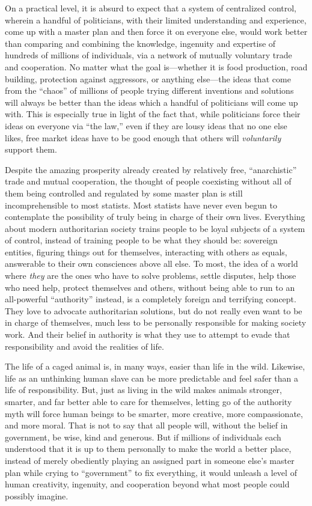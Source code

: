 \documentclass{book}
\begin{document}
On a practical level, it is absurd to expect that a system of centralized control, wherein a handful of politicians, with their limited understanding and experience, come up with a master plan and then force it on everyone else, would work better than comparing and combining the knowledge, ingenuity and expertise of hundreds of millions of individuals, via a network of mutually voluntary trade and cooperation. No matter what the goal is---whether it is food production, road building, protection against aggressors, or anything else---the ideas that come from the \enquote{chaos} of millions of people trying different inventions and solutions will always be better than the ideas which a handful of politicians will come up with. This is especially true in light of the fact that, while politicians force their ideas on everyone via \enquote{the law,} even if they are lousy ideas that no one else likes, free market ideas have to be good enough that others will \emph{voluntarily} support them.

Despite the amazing prosperity already created by relatively free, \enquote{anarchistic} trade and mutual cooperation, the thought of people coexisting without all of them being controlled and regulated by some master plan is still incomprehensible to most statists. Most statists have never even begun to contemplate the possibility of truly being in charge of their own lives. Everything about modern authoritarian society trains people to be loyal subjects of a system of control, instead of training people to be what they should be: sovereign entities, figuring things out for themselves, interacting with others as equals, answerable to their own consciences above all else. To most, the idea of a world where \emph{they} are the ones who have to solve problems, settle disputes, help those who need help, protect themselves and others, without being able to run to an all-powerful \enquote{authority} instead, is a completely foreign and terrifying concept. They love to advocate authoritarian solutions, but do not really even want to be in charge of themselves, much less to be personally responsible for making society work. And their belief in authority is what they use to attempt to evade that responsibility and avoid the realities of life.

The life of a caged animal is, in many ways, easier than life in the wild. Likewise, life as an unthinking human slave can be more predictable and feel safer than a life of responsibility. But, just as living in the wild makes animals stronger, smarter, and far better able to care for themselves, letting go of the authority myth will force human beings to be smarter, more creative, more compassionate, and more moral. That is not to say that all people will, without the belief in government, be wise, kind and generous. But if millions of individuals each understood that it is up to them personally to make the world a better place, instead of merely obediently playing an assigned part in someone else's master plan while crying to \enquote{government} to fix everything, it would unleash a level of human creativity, ingenuity, and cooperation beyond what most people could possibly imagine.
\end{document}
